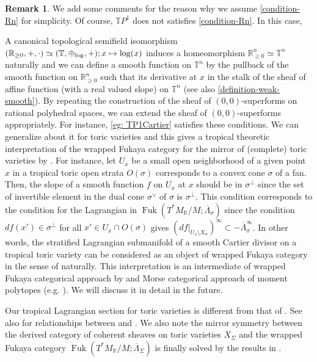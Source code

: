 \documentclass[a4paper,dvipdfmx,reqno,12pt]{amsart}
\theoremstyle{definition}
\newtheorem{remark}[theorem]{Remark}
\newcommand{\mb}[1]{\mathbb{#1}}%
\newcommand{\opn}[1]{\operatorname{#1}}
\newcommand{\simto}{ 
\mathrel{\raisebox{0.13em}{${\sim}$}}
\kern -0.75em \mathrel{\raisebox{-0.11em}{${\scriptstyle \to}$}}  
}
\numberwithin{equation}{section}
\begin{document}
\begin{remark}

We add some comments for the reason 
why we assume \cref{condition-Rn} for simplicity.
Of course, $\mathbb{T}P^{1}$ does not satisfies
\cref{condition-Rn}. In this case, 

A canonical topological semifield isomorphism 
$({\mathbb{R}}_{\geq 0},+,\cdot)\simto 
(\mb{T},\oplus_{\opn{log}},+);x\mapsto \log(x)$
induces a homeomorphism ${\mathbb{R}}_{\geq 0}^{n}\simeq \mb{T}^{n}$
naturally and we can define a smooth function on 
$\mb{T}^{n}$ by the pullback of the smooth function on 
${\mathbb{R}}_{\geq 0}^{n}$ such that its derivative at $x$ in
the stalk of the sheaf of affine function
(with a real valued slope) on $\mb{T}^{n}$
(see also \cref{definition-weak-smooth}).
 By repeating
the construction of the sheaf of $(0,0)$-superforms on 
rational polyhedral spaces, we can extend the sheaf of
$(0,0)$-superforms appropriately.
For instance, \cref{eg: TP1Cartier} satisfies 
these conditions. We can generalize about it for toric
varieties and this gives a tropical theoretic interpretation 
of the wrapped Fukaya category for the mirror of
(complete) toric varieties by \cite{MR2871160}.
For instance, let $U_{x}$ be a small open neighborhood of 
a given point $x$ in a tropical toric open strata $O(\sigma)$
 corresponds to a convex cone $\sigma$ of a fan.
Then, the slope of a smooth function $f$ on $U_{x}$ at $x$
should be in $\sigma^{\bot}$ since the set of 
invertible element
in the dual cone $\sigma^{\vee}$ of $\sigma$ is $\sigma^{\bot}$.
This condition corresponds to the condition for the Lagrangian
in $\opn{Fuk}(T^{*}M_{{\mathbb{R}}}/M;\overline{\Lambda}_{\sigma})$ 
\cite[3.1]{MR2871160} since
the condition $df(x')\in\sigma^{\bot}$ for all 
$x'\in U_x\cap O(\sigma)$ gives 
$(df|_{U_{x}\setminus X_{\sigma}})^{\infty}\subset 
-\overline{\Lambda}_{\sigma}^{\infty}$.
In other words, the stratified Lagrangian submanifold 
of a smooth Cartier divisor on a tropical toric variety
can be considered as 
an object of wrapped Fukaya category in the sense of
\cite{MR2871160} naturally. This interpretation is 
an intermediate of wrapped Fukaya categorical approach by
\cite{MR2871160}
and Morse categorical approach of moment polytopes
(e.g. \cite{MR4234675}).
We will discuss it in detail in the future.

Our tropical Lagrangian section for toric varieties is 
different from that of \cite{MR2240909,MR2529936}.
See also \cite[Appendix C.2.]{MR2871160} for relationships
between \cite{MR2871160} and \cite{MR2240909,MR2529936}.
We also note the mirror symmetry between the derived category of
coherent sheaves on toric varieties $X_{\Sigma}$ and
the wrapped Fukaya category 
$\opn{Fuk}(T^{*}M_{{\mathbb{R}}}/M;\overline{\Lambda}_{\Sigma})$
is finally solved by the results in \cite{MR4132582}.
\end{remark}
\end{document}

